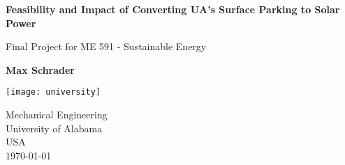\begin{titlepage}
    \begin{center}
        \vspace*{1cm}
            
        \Huge
        \textbf{Feasibility and Impact of Converting UA's Surface Parking to Solar Power}
            
        \vspace{0.5cm}
        \LARGE
        Final Project for ME 591 - Sustainable Energy
            
        \vspace{1.5cm}
            
        \textbf{Max Schrader}
            
        \vfill
            
        \vspace{0.8cm}
            
        \texttt{[image: university]}
            
        \Large
        Mechanical Engineering\\
        University of Alabama\\
        USA\\
        \today
            
    \end{center}
\end{titlepage}
